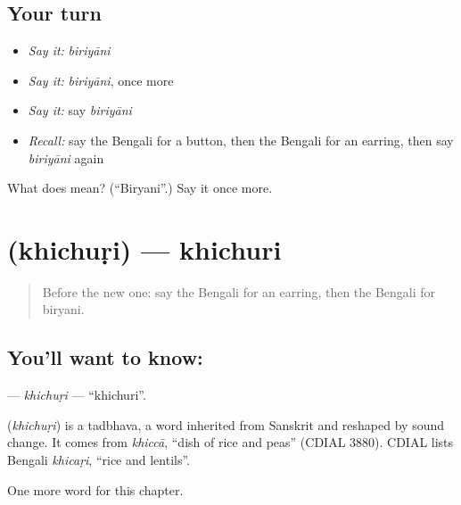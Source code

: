 \subsection*{Your turn}
\begin{itemize}
\raggedright
  \item \emph{Say it:} \emph{biriyāni}
  \item \emph{Say it:} \emph{biriyāni}, once more
  \item \emph{Say it:} say \emph{biriyāni}
  \item \emph{Recall:} say the Bengali for a button, then the Bengali for an earring, then say \emph{biriyāni} again
\end{itemize}

\begin{tcolorbox}[breakable,colback=teal!4,colframe=teal!35!black,title={Before you move on}]
What does  mean? (\textquotedblleft{}Biryani\textquotedblright{}.) Say it once more.
\end{tcolorbox}
\section[\texorpdfstring{\bn{খিচুড়ি} (khichuṛi)}{খিচুড়ি (khichuṛi)}]{ (khichuṛi) — khichuri}

\label{lesson:BN-C196-khichuri}



\begin{quote}
Before the new one: say the Bengali for an earring, then the Bengali for biryani.
\end{quote}

\subsection*{You'll want to know: }
\textbf{} — \emph{khichuṛi} — \textquotedblleft{}khichuri\textquotedblright{}.

\begin{cousinweb}
\textbf{} (\emph{khichuṛi}) is a tadbhava, a word inherited from Sanskrit and reshaped by sound change. It comes from \emph{khiccā}, \textquotedblleft{}dish of rice and peas\textquotedblright{} (CDIAL 3880). CDIAL lists Bengali \emph{khicaṛi}, \textquotedblleft{}rice and lentils\textquotedblright{}.
\end{cousinweb}

\begin{grammarlens}[title={What you've built}]
One more word for this chapter.
\end{grammarlens}

